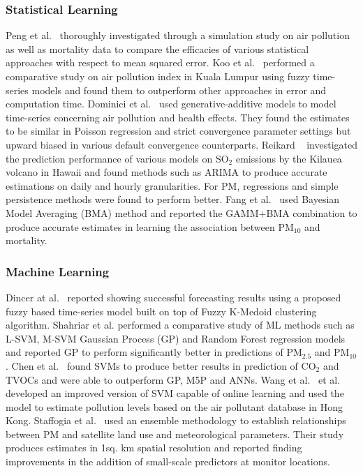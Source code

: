 \documentclass[twocolumn]{svjour3}          %
\begin{document}
\subsubsection{Statistical Learning} Peng et al.~\cite{Peng.2006} thoroughly investigated through a simulation study on air pollution as well as mortality data to compare the efficacies of various statistical approaches with respect to mean squared error. Koo et al.~\cite{Koo.2020} performed a comparative study on air pollution index in Kuala Lumpur using fuzzy time-series models and found them to outperform other approaches in error and computation time. Dominici et al.~\cite{Dominici.2002} used generative-additive models to model time-series concerning air pollution and health effects. They found the estimates to be similar in Poisson regression and strict convergence parameter settings but upward biased in various default convergence counterparts. Reikard ~\cite{Reikard.2019} investigated the prediction performance of various models on SO${_2}$ emissions by the Kilauea volcano in Hawaii and found methods such as ARIMA to produce accurate estimations on daily and hourly granularities. For PM, regressions and simple persistence methods were found to perform better. Fang et al.~\cite{Fang.2016} used Bayesian Model Averaging (BMA) method and reported the GAMM+BMA combination to produce accurate estimates in learning the association between PM${_{10}}$ and mortality.

\subsubsection{Machine Learning} Dincer at al.~\cite{Dincer.2018} reported showing successful forecasting results using a proposed fuzzy based time-series model built on top of Fuzzy K-Medoid clustering algorithm. Shahriar et al.\cite{Shahriar.2020} performed a comparative study of ML methods such as L-SVM, M-SVM Gaussian Process (GP) and Random Forest regression models and reported GP to perform significantly better in predictions of PM${_{2.5}}$ and PM${_{10}}$. Chen et al.~\cite{Chen.2018} found SVMs to produce better results in prediction of CO${_2}$ and TVOCs and were able to outperform GP, M5P and ANNs. Wang et al.~\cite{Wang.2008} et al. developed an improved version of SVM capable of online learning and used the model to estimate pollution levels based on the air pollutant database in Hong Kong. Staffogia et al.~\cite{Staffogia.2019} used an ensemble methodology to establish relationships between PM and satellite land use and meteorological parameters. Their study produces estimates in 1sq. km spatial resolution and reported finding improvements in the addition of small-scale predictors at monitor locations.
\end{document}
